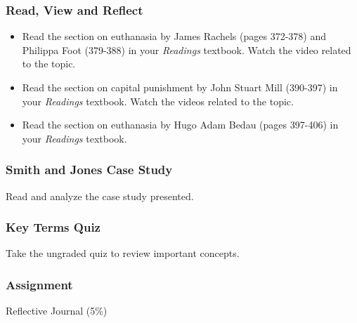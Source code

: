 \documentclass[
]{book}
\providecommand{\tightlist}{%
  \setlength{\itemsep}{0pt}\setlength{\parskip}{0pt}}
\begin{document}
\begin{reflect}
\hypertarget{read-view-and-reflect-24}{%
\subsubsection*{Read, View and Reflect}\label{read-view-and-reflect-24}}

\begin{itemize}
\tightlist
\item
  Read the section on euthanasia by James Rachels (pages 372-378) and Philippa Foot (379-388) in your \emph{Readings} textbook. Watch the video related to the topic.\\
\item
  Read the section on capital punishment by John Stuart Mill (390-397) in your \emph{Readings} textbook. Watch the videos related to the topic.\\
\item
  Read the section on euthanasia by Hugo Adam Bedau (pages 397-406) in your \emph{Readings} textbook.
\end{itemize}

\hypertarget{smith-and-jones-case-study}{%
\subsubsection*{Smith and Jones Case Study}\label{smith-and-jones-case-study}}

Read and analyze the case study presented.

\hypertarget{key-terms-quiz-6}{%
\subsubsection*{Key Terms Quiz}\label{key-terms-quiz-6}}

Take the ungraded quiz to review important concepts.

\hypertarget{assignment-5}{%
\subsubsection*{\texorpdfstring{\textbf{Assignment}}{Assignment}}\label{assignment-5}}

Reflective Journal (5\%)
\end{reflect}
\end{document}
